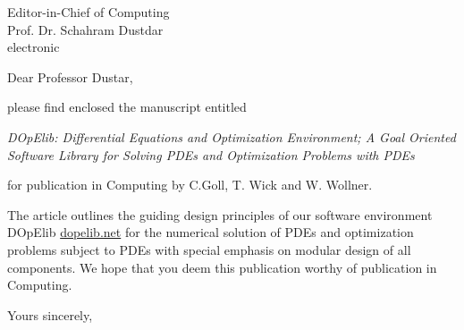 \documentclass{uhhbrief-fak6}    %
\date{\today}
\begin{document}
\begin{letter}{Editor-in-Chief of Computing\\Prof. Dr. Schahram Dustdar\\[\baselineskip]
    electronic}

\subject{Paper Submission}

\opening{Dear Professor Dustar,}

please find enclosed the manuscript entitled

{\em DOpElib: Differential Equations and Optimization Environment; A Goal Oriented Software Library for Solving PDEs and Optimization Problems with PDEs}

for publication in Computing by
C.Goll, T. Wick and W. Wollner.

The article outlines the guiding design principles of our software environment
DOpElib \url{dopelib.net} for the numerical solution of PDEs and optimization problems subject 
to PDEs with special emphasis on modular design of all components. 
We hope that you deem this publication worthy of publication in Computing.

\closing{Yours sincerely,}




\end{letter}
\end{document}

